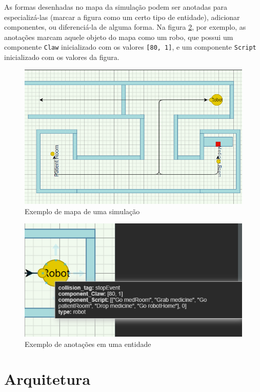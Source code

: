 As formas desenhadas no mapa da simulação podem ser anotadas para especializá-las (marcar a figura como um certo tipo de entidade), adicionar componentes, ou diferenciá-la de alguma forma. Na figura \ref{fig:example_annotations}, por exemplo, as anotações marcam aquele objeto do mapa como um robo, que possui um componente \texttt{Claw} inicializado com os valores \texttt{[80, 1]}, e um componente \texttt{Script} inicializado com os valores da figura.

\begin{figure}[ht]
    \centering
    \includegraphics[width=.8\textwidth]{img/map_example.png}
    \caption{Exemplo de mapa de uma simulação}
    \label{fig:example_map}
\end{figure}

\begin{figure}[ht]
    \centering
    \includegraphics[width=.8\textwidth]{img/robot_annotations.png}
    \caption{Exemplo de anotações em uma entidade}
    \label{fig:example_annotations}
\end{figure}


\section{Arquitetura}
\label{sec:architecture}

